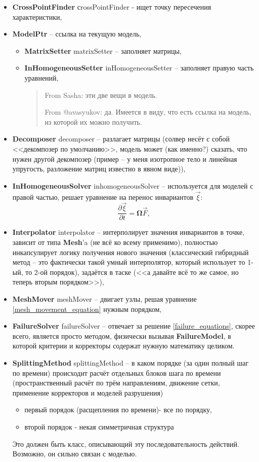 \documentclass[a4paper,12pt]{article}
\numberwithin{equation}{section}
\begin{document}
	\begin{itemize}
		\item{\textbf{CrossPointFinder} сrossPointFinder - ищет точку пересечения характеристики,}
		\item{\textbf{ModelPtr} -- ссылка на текущую модель,}
		\begin{itemize}
			\item{\textbf{MatrixSetter} matrixSetter -- заполняет матрицы,}
			\item{\textbf{InHomogeneousSetter} inHomogeneousSetter -- заполняет правую часть уравнений,}

\blockquote{
From Sasha: эти две вещи в модель.

From @avasyukov: да. Имеется в виду, что есть ссылка на модель, из которой их можно получить.
}
		\end{itemize}
		\item{\textbf{Decomposer} decomposer -- разлагает матрицы (солвер несёт с собой <<декомпозер по умолчанию>>, модель может (как именно?) сказать, что нужен другой декомпозер (пример -- у меня изотропное тело и линейная упругость, разложение матриц известно в явном виде)),}
		\item{\textbf{InHomogeneousSolver} inhomogeneousSolver -- используется для моделей с правой частью, решает уравнение на перенос инвариантов $\vec{\xi}$:}
		\begin{equation}
			\label{invariant_equation}
			\frac{\partial\vec{\xi}}{\partial{t}}=\mathbf{\Omega}\vec{F},
		\end{equation}
		\item{\textbf{Interpolator} interpolator -- интерполирует значения инвариантов в точке, зависит от типа \textbf{Mesh}'a (не всё ко всему применимо), полностью инкапсулирует логику получения нового значения (классический гибридный метод -- это фактически такой умный интерполятор, который использует то 1-ый, то 2-ой порядок), задаётся в таске (<<а давайте всё то же самое, но теперь вторым порядком>>),}
		\item{\textbf{MeshMover} meshMover -- двигает узлы, решая уравнение \eqref{mesh_movement_equation} нужным порядком,}
		\item{\textbf{FailureSolver} failureSolver -- отвечает за решение \eqref{failure_equations}, скорее всего, является просто методом, физически вызывая \textbf{FailureModel}, в которой критерии и корректоры содержат нужную математику целиком.}
		\item{\textbf{SplittingMethod} splittingMethod -- в каком порядке (за один полный шаг по времени) происходит расчёт отдельных блоков шага по времени (пространственный расчёт по трём направлениям, движение сетки, применение корректоров и моделей разрушения)}
		\begin{itemize}
			\item{первый порядок (расщепления по времени)- все по порядку,}
			\item{второй порядок - некая симметричная структура}
		\end{itemize}
		Это должен быть класс, описывающий эту последовательность действий. Возможно, он сильно связан с моделью.
	\end{itemize}
	
\end{document}
